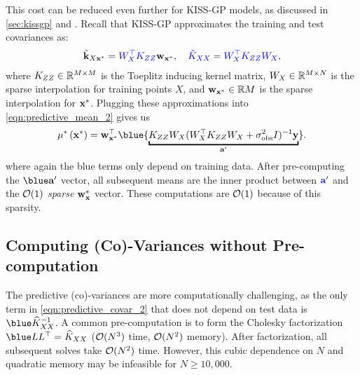 This cost can be reduced even further for KISS-GP models, as discussed in \cref{sec:kissgp} and \citep{wilson2015thoughts}.
Recall that KISS-GP approximates the training and test covariances as:
%
\begin{align*}
  \tilde{\mathbf{k}}_{X \mathbf{x}^*} = {\color{blue} W^\top_{X} K_{Z Z}} \mathbf{w}_{\mathbf{x}^*},
  \quad
  {\color{blue} \tilde{\ensuremath{K}}_{\ensuremath{X}\ensuremath{X}}} = {\color{blue} W^\top_{X} K_{Z Z} W_{X}},
\end{align*}
%
where $K_{ZZ} \in \mathbb{R}^{M \times M}$ is the Toeplitz inducing kernel matrix, $W_{X} \in \mathbb{R}^{M \times N}$ is the sparse interpolation for training points $X$, and $\mathbf{w}_{\mathbf{x}^*} \in \mathbb{R}{M}$ is the sparse interpolation for $\mathbf{x}^*$.
Plugging these approximations into \cref{eqn:predictive_mean_2} gives us
\[
  \meantest{\bxtest} = \bw_{\bxtest}^\top {\blue{\underbracket{\bK_{\bZ\bZ} \bW_{\bX}(\bW_{\bX}^{\top}\bK_{\bZ\bZ}\bW_{\bX} + \sigma_\text{obs}^{2} \bI)^{-1} \by}_{\ba'}}}.
\]
where again the blue terms only depend on training data.
After pre-computing the $\blue \ba'$ vector, all subsequent means are the inner product between $\color{blue} \mathbf{a}'$ and the \emph{$\bigo{1}$ sparse} $\bw_\bxtest$ vector.
These computations are $\bigo{1}$ because of this sparsity.

\subsection{Computing (Co)-Variances without Pre-computation}

The predictive (co)-variances are more computationally challenging, as the only term in \cref{eqn:predictive_covar_2} that does not depend on test data is $\blue \trainK^{-1}$.
A common pre-computation is to form the Cholesky factorization $\blue \bL \bL^\top = \trainK$ ($\bigo{N^3}$ time, $\bigo{N^2}$ memory).
After factorization, all subsequent solves take $\bigo{N^2}$ time.
However, this cubic dependence on $N$ and quadratic memory may be infeasible for $N \geq 10,\!000$.

